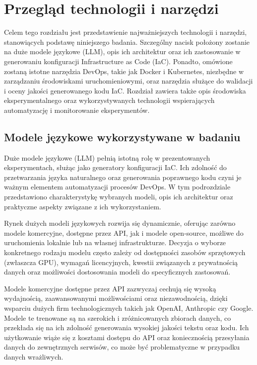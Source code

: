 \clearpage %

\section{Przegląd technologii i narzędzi}

Celem tego rozdziału jest przedstawienie najważniejszych technologii i narzędzi, stanowiących podstawę niniejszego badania. Szczególny nacisk położony zostanie na duże modele językowe (LLM), opis ich architektur oraz ich zastosowanie w generowaniu konfiguracji Infrastructure as Code (IaC). Ponadto, omówione zostaną istotne narzędzia DevOps, takie jak Docker i Kubernetes, niezbędne w zarządzaniu środowiskami uruchomieniowymi, oraz narzędzia służące do walidacji i oceny jakości generowanego kodu IaC. Rozdział zawiera także opis środowiska eksperymentalnego oraz wykorzystywanych technologii wspierających automatyzację i monitorowanie eksperymentów.

\subsection{Modele językowe wykorzystywane w badaniu}

Duże modele językowe (LLM) pełnią istotną rolę w prezentowanych eksperymentach, służąc jako generatory konfiguracji IaC. Ich zdolność do przetwarzania języka naturalnego oraz generowania poprawnego kodu czyni je ważnym elementem automatyzacji procesów DevOps. W tym podrozdziale przedstawiono charakterystykę wybranych modeli, opis ich architektur oraz praktyczne aspekty związane z ich wykorzystaniem.

Rynek dużych modeli językowych rozwija się dynamicznie, oferując zarówno modele komercyjne, dostępne przez API, jak i modele open-source, możliwe do uruchomienia lokalnie lub na własnej infrastrukturze. Decyzja o wyborze konkretnego rodzaju modelu często zależy od dostępności zasobów sprzętowych (zwłaszcza GPU), wymagań licencyjnych, kwestii związanych z prywatnością danych oraz możliwości dostosowania modeli do specyficznych zastosowań.

Modele komercyjne dostępne przez API zazwyczaj cechują się wysoką wydajnością, zaawansowanymi możliwościami oraz niezawodnością, dzięki wsparciu dużych firm technologicznych takich jak OpenAI, Anthropic czy Google. Modele te trenowane są na szerokich i zróżnicowanych zbiorach danych, co przekłada się na ich zdolność generowania wysokiej jakości tekstu oraz kodu. Ich użytkowanie wiąże się z kosztami dostępu do API oraz koniecznością przesyłania danych do zewnętrznych serwisów, co może być problematyczne w przypadku danych wrażliwych.

